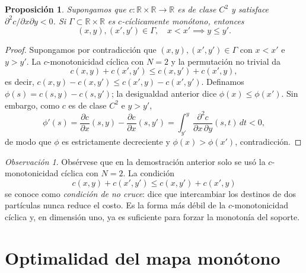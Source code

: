 \documentclass[12pt, a4paper]{amsbook}
\newcommand{\R}{{\mathbb R}}
\newtheorem{prop}[teo]{Proposición}
\theoremstyle{remark}
\newtheorem{obs}[teo]{Observación}
\theoremstyle{definition}
\numberwithin{section}{chapter}
\numberwithin{subsection}{section}
\numberwithin{equation}{section}
\numberwithin{figure}{chapter}
\begin{document}
\begin{prop}\label{prop:twist-monotone}
Supongamos que $c\colon\R\times\R\to\R$ es de clase $C^2$ y satisface
$\partial^2 c/\partial x\partial y<0$. Si $\Gamma\subset\R\times\R$ es $c$-cíclicamente
monótono, entonces
\[
(x,y),(x',y')\in\Gamma,\quad x<x'
\implies
y\le y'.
\]
\end{prop}
\begin{proof}
Supongamos por contradicción que $(x,y),(x',y')\in\Gamma$ con $x<x'$ e $y>y'$.
La $c$-monotonicidad cíclica con $N=2$ y la permutación no trivial da
\[
c(x,y)+c(x',y')\le c(x,y')+c(x',y),
\]
es decir, $c(x,y)-c(x,y')\le c(x',y)-c(x',y')$.
Definamos $\phi(s)=c(s,y)-c(s,y')$; la desigualdad anterior dice
$\phi(x)\le\phi(x')$. Sin embargo, como $c$ es de clase $C^2$ e $y>y'$,
\[
\phi'(s)
=\frac{\partial c}{\partial x}(s,y)-\frac{\partial c}{\partial x}(s,y')
=\int_{y'}^{y}\frac{\partial^2 c}{\partial x\,\partial y}(s,t)\,dt<0,
\]
de modo que $\phi$ es estrictamente decreciente y $\phi(x)>\phi(x')$,
contradicción.
\end{proof}

\begin{obs}
Obsérvese que en la demostración anterior solo se usó la $c$-monotonicidad cíclica
con $N=2$. La condición
\[
c(x,y)+c(x',y')\le c(x,y')+c(x',y)
\]
se conoce como \emph{condición de no cruce}: dice que intercambiar los destinos de
dos partículas nunca reduce el costo. Es la forma más débil de la
$c$-monotonicidad cíclica y, en dimensión uno, ya es suficiente para forzar la
monotonía del soporte.
\end{obs}

\section{Optimalidad del mapa monótono}
\end{document}
